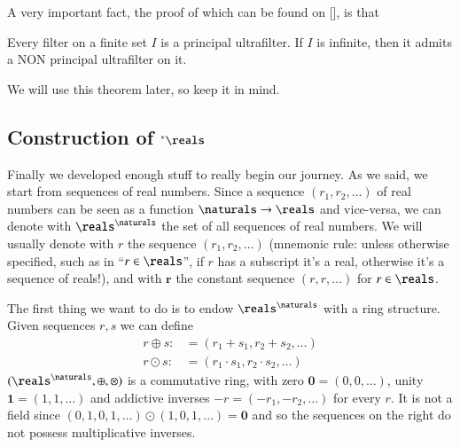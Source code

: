 \documentclass[adraft, copyright,creativecommons,sharealike,noncommercial]{eptcs}
\newcommand{\nstar}{{^*}}
\begin{document}
A very important fact, the proof of which can be found on [], is that
\begin{theorem}\label{thm:nonprincipalexists}
	Every filter on a finite set $I$ is a principal ultrafilter. If $I$ is infinite, then it admits a NON principal ultrafilter on it.
\end{theorem}
We will use this theorem later, so keep it in mind.

\subsection{Construction of $\nstar \reals$}
Finally we developed enough stuff to really begin our journey. As we said, we start from sequences of real numbers.
Since a sequence $(r_1, r_2, \dots)$ of real numbers can be seen as a function $\naturals \to \reals$ and vice-versa, we can denote with $\reals^\naturals$ the set of all sequences of real numbers. We will usually denote with $r$ the sequence $(r_1, r_2, \dots)$ (mnemonic rule: unless otherwise specified, such as in ``$r \in \reals$'', if $r$ has a subscript it's a real, otherwise it's a sequence of reals!), and with $\mathbf{r}$ the constant sequence $(r,r,\dots)$ for $r \in \reals$.

The first thing we want to do is to endow $\reals^\naturals$ with a ring structure. Given sequences $r,s$ we can define
\begin{align*}
	r \oplus s :&= (r_1 + s_1, r_2 + s_2, \dots)\\
	r \odot s :&= (r_1\cdot s_1, r_2 \cdot s_2, \dots) 
\end{align*}
$(\reals^\naturals, \oplus, \otimes)$ is a commutative ring, with zero $\mathbf{0} = (0,0,\dots)$, unity $\mathbf{1} = (1,1, \dots)$ and addictive inverses $-r = (-r_1, -r_2, \dots)$ for every $r$. It is not a field since $(0,1,0,1,\dots) \odot (1,0,1,\dots) = \mathbf{0}$
and so the sequences on the right do not possess multiplicative inverses.
\end{document}
